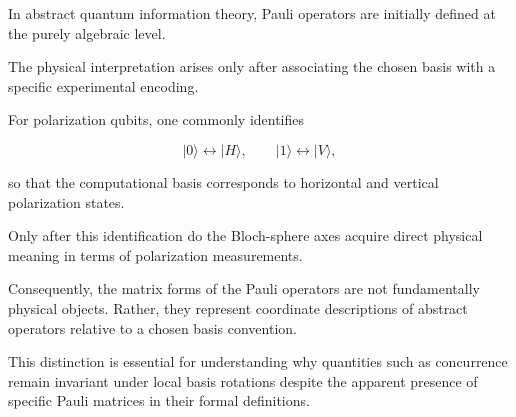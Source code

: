 In abstract quantum information theory, Pauli operators are initially defined at the purely algebraic level.

The physical interpretation arises only after associating the chosen basis with a specific experimental encoding.

For polarization qubits, one commonly identifies

\[
|0\rangle
\leftrightarrow
|H\rangle,
\qquad
|1\rangle
\leftrightarrow
|V\rangle,
\]

so that the computational basis corresponds to horizontal and vertical polarization states.

Only after this identification do the Bloch-sphere axes acquire direct physical meaning in terms of polarization measurements.

\medskip

Consequently, the matrix forms of the Pauli operators are not fundamentally physical objects. Rather, they represent coordinate descriptions of abstract operators relative to a chosen basis convention.

This distinction is essential for understanding why quantities such as concurrence remain invariant under local basis rotations despite the apparent presence of specific Pauli matrices in their formal definitions.

